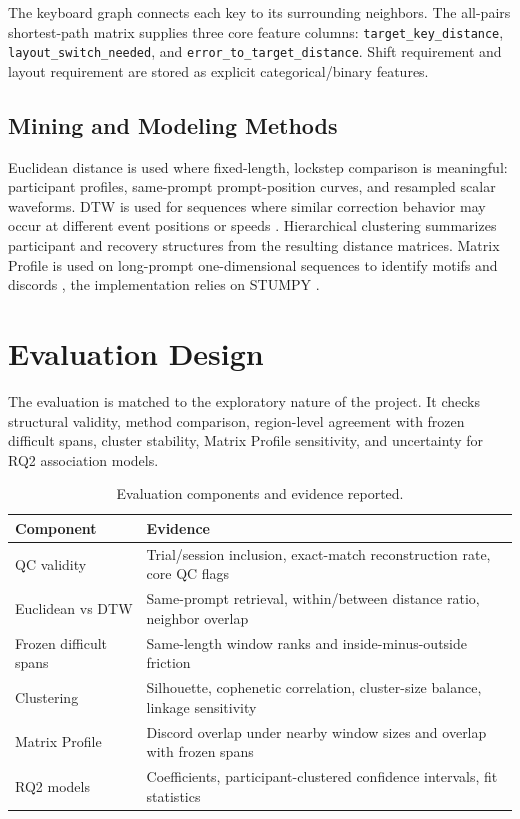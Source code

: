 \documentclass[11pt,a4paper]{article}
\newcommand{\metric}[1]{\texttt{#1}}
\begin{document}
The keyboard graph connects each key to its surrounding neighbors. The all-pairs shortest-path matrix supplies three core feature columns: \metric{target\_key\_distance}, \metric{layout\_switch\_needed}, and \metric{error\_to\_target\_distance}. Shift requirement and layout requirement are stored as explicit categorical/binary features.

\subsection{Mining and Modeling Methods}

Euclidean distance is used where fixed-length, lockstep comparison is meaningful: participant profiles, same-prompt prompt-position curves, and resampled scalar waveforms. DTW is used for sequences where similar correction behavior may occur at different event positions or speeds \cite{berndt1994dtw}. Hierarchical clustering summarizes participant and recovery structures from the resulting distance matrices. Matrix Profile is used on long-prompt one-dimensional sequences to identify motifs and discords \cite{yeh2016matrixprofile}, the implementation relies on STUMPY \cite{law2019stumpy}.

\section{Evaluation Design}

The evaluation is matched to the exploratory nature of the project. It checks structural validity, method comparison, region-level agreement with frozen difficult spans, cluster stability, Matrix Profile sensitivity, and uncertainty for RQ2 association models.

\begin{table}[H]
\centering
\caption{Evaluation components and evidence reported.}
\label{tab:evaluation_design}
\small
\begin{tabularx}{\linewidth}{l Y}
\toprule
Component & Evidence \\
\midrule
QC validity & Trial/session inclusion, exact-match reconstruction rate, core QC flags \\
Euclidean vs DTW & Same-prompt retrieval, within/between distance ratio, neighbor overlap \\
Frozen difficult spans & Same-length window ranks and inside-minus-outside friction \\
Clustering & Silhouette, cophenetic correlation, cluster-size balance, linkage sensitivity \\
Matrix Profile & Discord overlap under nearby window sizes and overlap with frozen spans \\
RQ2 models & Coefficients, participant-clustered confidence intervals, fit statistics \\
\bottomrule
\end{tabularx}
\end{table}
\end{document}
